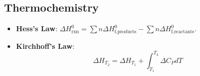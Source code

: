 \subsection{Thermochemistry}
\begin{itemize}
    \item \textbf{Hess's Law}: $\Delta H^0_{\text{rxn}} = \sum n \Delta H^0_{\text{f,products}} - \sum n \Delta H^0_{\text{f,reactants}}$.
    \item \textbf{Kirchhoff's Law}:
    \begin{equation}
        \Delta H_{T_2} = \Delta H_{T_1} + \int_{T_1}^{T_2} \Delta C_P dT
    \end{equation}
\end{itemize}
